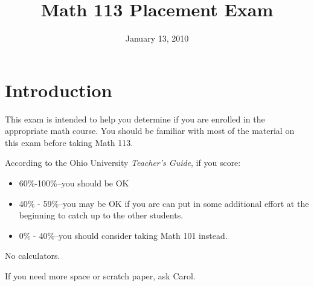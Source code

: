 \documentclass[fleqn,addpoints]{exam}
\title{Math 113 Placement Exam}
\author{}
\date{January 13, 2010}
\begin{document}
\maketitle

\vspace{0.2in}
\vspace{0.2in}

\begin{center}
\gradetable[h][pages]
\end{center}

\section{Introduction}

This exam is intended to help you determine if you are enrolled in the
appropriate math course.  You should be familiar with most of the material on
this exam before taking Math 113.  

According to the Ohio University {\em Teacher's Guide}, if you score:

\begin{itemize}
  \item 60\%-100\%--you should be OK
  \item 40\% - 59\%--you may be OK if you are can put in some additional effort
    at the beginning to catch up to the other students. 
  \item 0\% - 40\%--you should consider taking Math 101 instead.
\end{itemize}

No calculators.

If you need more space or scratch paper, ask Carol.

\ifprintanswers

\vspace{0.5 in}
\end{document}
